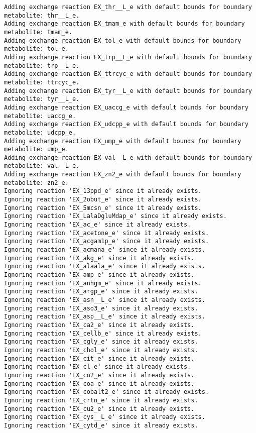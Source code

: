 \documentclass[
  letterpaper,
  DIV=11,
  numbers=noendperiod]{scrartcl}
\begin{document}
\begin{verbatim}
Adding exchange reaction EX_thr__L_e with default bounds for boundary metabolite: thr__L_e.
Adding exchange reaction EX_tmam_e with default bounds for boundary metabolite: tmam_e.
Adding exchange reaction EX_tol_e with default bounds for boundary metabolite: tol_e.
Adding exchange reaction EX_trp__L_e with default bounds for boundary metabolite: trp__L_e.
Adding exchange reaction EX_ttrcyc_e with default bounds for boundary metabolite: ttrcyc_e.
Adding exchange reaction EX_tyr__L_e with default bounds for boundary metabolite: tyr__L_e.
Adding exchange reaction EX_uaccg_e with default bounds for boundary metabolite: uaccg_e.
Adding exchange reaction EX_udcpp_e with default bounds for boundary metabolite: udcpp_e.
Adding exchange reaction EX_ump_e with default bounds for boundary metabolite: ump_e.
Adding exchange reaction EX_val__L_e with default bounds for boundary metabolite: val__L_e.
Adding exchange reaction EX_zn2_e with default bounds for boundary metabolite: zn2_e.
Ignoring reaction 'EX_13ppd_e' since it already exists.
Ignoring reaction 'EX_2obut_e' since it already exists.
Ignoring reaction 'EX_5mcsn_e' since it already exists.
Ignoring reaction 'EX_LalaDgluMdap_e' since it already exists.
Ignoring reaction 'EX_ac_e' since it already exists.
Ignoring reaction 'EX_acetone_e' since it already exists.
Ignoring reaction 'EX_acgam1p_e' since it already exists.
Ignoring reaction 'EX_acmana_e' since it already exists.
Ignoring reaction 'EX_akg_e' since it already exists.
Ignoring reaction 'EX_alaala_e' since it already exists.
Ignoring reaction 'EX_amp_e' since it already exists.
Ignoring reaction 'EX_anhgm_e' since it already exists.
Ignoring reaction 'EX_argp_e' since it already exists.
Ignoring reaction 'EX_asn__L_e' since it already exists.
Ignoring reaction 'EX_aso3_e' since it already exists.
Ignoring reaction 'EX_asp__L_e' since it already exists.
Ignoring reaction 'EX_ca2_e' since it already exists.
Ignoring reaction 'EX_cellb_e' since it already exists.
Ignoring reaction 'EX_cgly_e' since it already exists.
Ignoring reaction 'EX_chol_e' since it already exists.
Ignoring reaction 'EX_cit_e' since it already exists.
Ignoring reaction 'EX_cl_e' since it already exists.
Ignoring reaction 'EX_co2_e' since it already exists.
Ignoring reaction 'EX_coa_e' since it already exists.
Ignoring reaction 'EX_cobalt2_e' since it already exists.
Ignoring reaction 'EX_crtn_e' since it already exists.
Ignoring reaction 'EX_cu2_e' since it already exists.
Ignoring reaction 'EX_cys__L_e' since it already exists.
Ignoring reaction 'EX_cytd_e' since it already exists.

\end{verbatim}
\end{document}
